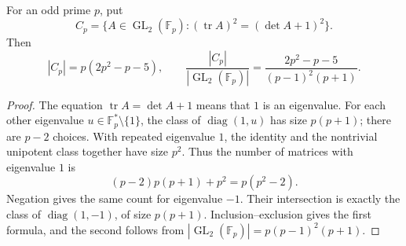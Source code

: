 \begin{lemma}\label{bc-count}
For an odd prime $p$, put
\[
 C_p=\{A\in\operatorname{GL}_2(\mathbb F_p):
             (\operatorname{tr}A)^2=(\det A+1)^2\}.
\]
Then
\begin{equation}\label{bc-count-formula}
 |C_p|=p(2p^2-p-5),\qquad
 \frac{|C_p|}{|\operatorname{GL}_2(\mathbb F_p)|}
 =\frac{2p^2-p-5}{(p-1)^2(p+1)}.
\end{equation}
\end{lemma}
\begin{proof}
The equation $\operatorname{tr}A=\det A+1$ means that $1$ is an
eigenvalue. For each other eigenvalue $u\in\mathbb F_p^*\setminus\{1\}$,
the class of $\operatorname{diag}(1,u)$ has size $p(p+1)$; there
are $p-2$ choices. With repeated eigenvalue $1$, the identity and the
nontrivial unipotent class together have size $p^2$. Thus the number
of matrices with eigenvalue $1$ is
\[
 (p-2)p(p+1)+p^2=p(p^2-2).
\]
Negation gives the same count for eigenvalue $-1$. Their intersection
is exactly the class of $\operatorname{diag}(1,-1)$, of size $p(p+1)$.
Inclusion--exclusion gives the first formula, and the second follows
from $|\operatorname{GL}_2(\mathbb F_p)|=p(p-1)^2(p+1)$.
\end{proof}

